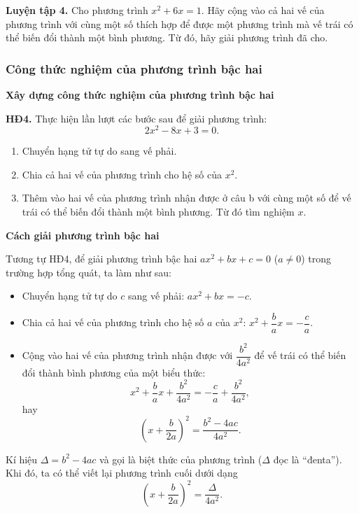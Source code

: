 \begin{lesson}
    \textbf{Luyện tập 4.} Cho phương trình $x^2+6x=1$. Hãy cộng vào cả hai vế của phương trình với cùng một số thích hợp để được một phương trình mà vế trái có thể biến đổi thành một bình phương. Từ đó, hãy giải phương trình đã cho.

    \answerline
    \answerline
    \answerline

    \subsubsection{Công thức nghiệm của phương trình bậc hai}

    \textbf{Xây dựng công thức nghiệm của phương trình bậc hai}

    \textbf{HĐ4.} Thực hiện lần lượt các bước sau để giải phương trình:
    \[
        2x^2-8x+3=0.
    \]
    \begin{enumerate}[label=\alph*)]
        \item Chuyển hạng tử tự do sang vế phải.
        \item Chia cả hai vế của phương trình cho hệ số của $x^2$.
        \item Thêm vào hai vế của phương trình nhận được ở câu b với cùng một số để vế trái có thể biến đổi thành một bình phương. Từ đó tìm nghiệm $x$.
    \end{enumerate}

    \answerline
    \answerline
    \answerline

    \textbf{Cách giải phương trình bậc hai}

    Tương tự HĐ4, để giải phương trình bậc hai $ax^2+bx+c=0$ ($a\ne0$) trong trường hợp tổng quát, ta làm như sau:
    \begin{itemize}
        \item Chuyển hạng tử tự do $c$ sang vế phải: $ax^2+bx=-c$.
        \item Chia cả hai vế của phương trình cho hệ số $a$ của $x^2$: $x^2+\dfrac{b}{a}x=-\dfrac{c}{a}$.
        \item Cộng vào hai vế của phương trình nhận được với $\dfrac{b^2}{4a^2}$ để vế trái có thể biến đổi thành bình phương của một biểu thức:
        \[
            x^2+\dfrac{b}{a}x+\dfrac{b^2}{4a^2}=-\dfrac{c}{a}+\dfrac{b^2}{4a^2},
        \]
        hay
        \[
            \left(x+\dfrac{b}{2a}\right)^2=\dfrac{b^2-4ac}{4a^2}.
        \]
    \end{itemize}

    Kí hiệu $\Delta=b^2-4ac$ và gọi là biệt thức của phương trình ($\Delta$ đọc là ``đenta''). Khi đó, ta có thể viết lại phương trình cuối dưới dạng
    \[
        \left(x+\dfrac{b}{2a}\right)^2=\dfrac{\Delta}{4a^2}.
    \]


\end{lesson}
